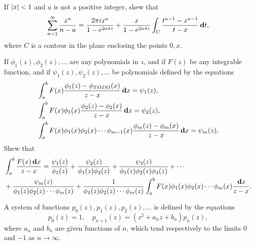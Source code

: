 \begin{wandwmiscexamples}
  \begin{wandwmiscexample}
    If $\left| x \right| < 1$ and $a$ is not a positive integer, shew that
    $$
    \sum_{n=1}^{\infty}
    \frac{x^{n}}{n - a}
    =
    \frac{2 \pi i x^{a}}{1 - e^{2 a \pi i}}
    +
    \frac{x}{1 - e^{2 a \pi i}}
    \int_{C} \frac{t^{a-1} - x^{a-1}}{t - x} \, \mathbf{d} t,
    $$
    where $C$ is a contour in the plane enclosing the points $0,x$.
  \end{wandwmiscexample}
  \begin{wandwmiscexample}
    If $\phi_{1}(z), \phi_{2}(z), \ldots$ are any polynomials in $z$,
    and if $F(z)$ be any integrable function, and if
    $\psi_{1}(z), \psi_{2}(z), \ldots$ be polynomials
    defined by the equations
    \begin{align*}
      &
      \int_{a}^{b}
      F(x) \frac{ \phi_{1}(z) - \phi_{TODO}(x) }{z - x}
      \, \mathbf{d} x
      =
      \psi_{1}(z),
      \\
      &
      \int_{a}^{b}
      F(x) \phi_{1}(x)
      \frac{ \phi_{2}(z) - \phi_{2}(x) }{z - x}
      \, \mathbf{d} x
      =
      \psi_{2}(z),
      \\
      &
      \int_{a}^{b}
      F(x)
      \phi_{1}(x) \phi_{2}(x) \cdots \phi_{m-1}(x)
      \frac{\phi_{m}(z) - \phi_{m}(x)}{z-x}
      \, \mathbf{d} x
      =
      \psi_{m}(z),
    \end{align*}
    Shew that
    \begin{align*}
      &
      \hfill
      \int_{a}^{b}
      \frac{F(x) \dmeasure x}{z - x}
      =
      \frac{\psi_{1}(z)}{\phi_{1}(z)}
      +
      \frac{\psi_{2}(z)}{\phi_{1}(z) \phi_{2}(z)}
      +
      \frac{\psi_{3}(z)}{\phi_{1}(z) \phi_{2}(z) \phi_{3}(z)}
      +
      \cdots
      \hfill
      \\
      &
      +
      \frac{\psi_{m}(z)}{\phi_{1}(z) \phi_{2}(z) \cdots \phi_{m}(z)}
      +
      \frac{1}{\phi_{1}(z) \phi_{2}(z) \cdots \phi_{m}(z)}
      \int_{a}^{b}
      F(x) \phi_{1}(x) \phi_{2}(x) \cdots \phi_{m}(x)
      \frac{ \dmeasure x }{z - x}.
    \end{align*}
  \end{wandwmiscexample}
  \begin{wandwmiscexample}
    A system of functions $p_{0}(z), p_{1}(z), p_{2}(z), \ldots$
    is defined by the equations
    $$
    p_{0}(z) = 1,
    \quad
    p_{n+1}(z) = (z^{2} + a_{n} z + b_{n}) p_{n}(z),
    $$
    where $a_{n}$ and $b_{n}$ are given functions of $n$, which tend
    respectively to the limits $0$ and $-1$ as $n \rightarrow \infty$.


\end{wandwmiscexample}
\end{wandwmiscexamples}
